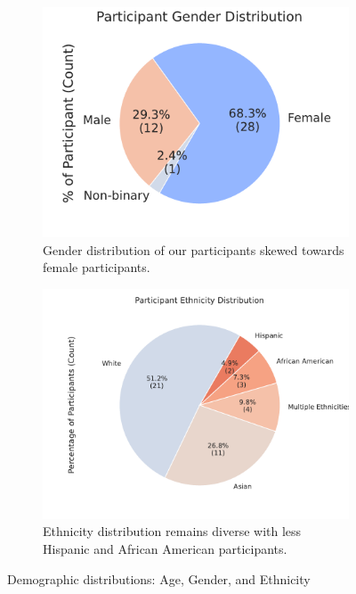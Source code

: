\begin{figure}[h]
    \begin{subfigure}[b]{0.45\textwidth}
        \centering
        \includegraphics[width=\textwidth]{content/image/demo/demo_gender.pdf}
        \caption{Gender distribution of our participants skewed towards female participants.}
        \label{fig:demoGender}
    \end{subfigure}
    \hfill
    \begin{subfigure}[b]{0.45\textwidth}
        \centering
        \includegraphics[width=\textwidth]{content/image/demo/demo_ethnicity.pdf}
        \caption{Ethnicity distribution remains diverse with less Hispanic and African American participants.}
        \label{fig:demoEthnicity}
    \end{subfigure}
    
    \caption{Demographic distributions: Age, Gender, and Ethnicity}
    \label{fig:Demographics}
\end{figure}

